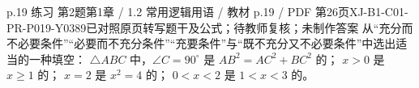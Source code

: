 \par\noindent\begin{minipage}{\linewidth}
\begin{bankitem}{p.19 练习 第2题}{第1章 / 1.2 常用逻辑用语 / 教材 p.19 / PDF 第26页}{XJ-B1-C01-PR-P019-Y0389}{已对照原页转写题干及公式；待教师复核；未制作答案}
从“充分而不必要条件”“必要而不充分条件”“充要条件”与“既不充分又不必要条件”中选出适当的一种填空：
$\triangle ABC$ 中，$\angle C=90^\circ$ 是 $AB^2=AC^2+BC^2$ 的\blank；
$x>0$ 是 $x\ge1$ 的\blank；
$x=2$ 是 $x^2=4$ 的\blank；
$0<x<2$ 是 $1<x<3$ 的\blank。
\end{bankitem}
\end{minipage}\par\medskip
